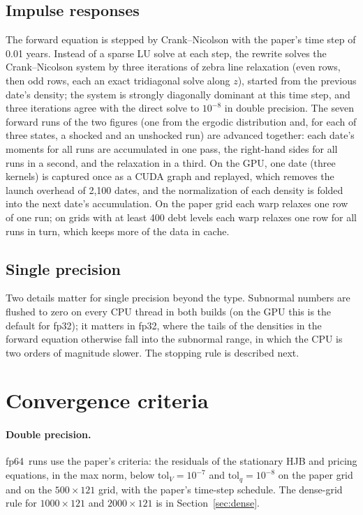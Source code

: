 \documentclass[11pt]{article}
\newcommand{\fpd}{\textsf{fp64}}
\newcommand{\fps}{\textsf{fp32}}
\begin{document}
\subsection{Impulse responses}
The forward equation is stepped by Crank--Nicolson with the paper's time step of 0.01 years. Instead of a sparse LU solve at each step, the rewrite solves the Crank--Nicolson system by three iterations of zebra line relaxation (even rows, then odd rows, each an exact tridiagonal solve along $z$), started from the previous date's density; the system is strongly diagonally dominant at this time step, and three iterations agree with the direct solve to $10^{-8}$ in double precision. The seven forward runs of the two figures (one from the ergodic distribution and, for each of three states, a shocked and an unshocked run) are advanced together: each date's moments for all runs are accumulated in one pass, the right-hand sides for all runs in a second, and the relaxation in a third. On the GPU, one date (three kernels) is captured once as a CUDA graph and replayed, which removes the launch overhead of 2{,}100 dates, and the normalization of each density is folded into the next date's accumulation. On the paper grid each warp relaxes one row of one run; on grids with at least 400 debt levels each warp relaxes one row for all runs in turn, which keeps more of the data in cache.

\subsection{Single precision}
Two details matter for single precision beyond the type. Subnormal numbers are flushed to zero on every CPU thread in both builds (on the GPU this is the default for \fps); it matters in \fps, where the tails of the densities in the forward equation otherwise fall into the subnormal range, in which the CPU is two orders of magnitude slower. The stopping rule is described next.

\section{Convergence criteria}
\label{sec:criteria}

\paragraph{Double precision.} \fpd\ runs use the paper's criteria: the residuals of the stationary HJB and pricing equations, in the max norm, below $\text{tol}_V=10^{-7}$ and $\text{tol}_q=10^{-8}$ on the paper grid and on the $500\times121$ grid, with the paper's time-step schedule. The dense-grid rule for $1000\times121$ and $2000\times121$ is in Section~\ref{sec:dense}.
\end{document}
